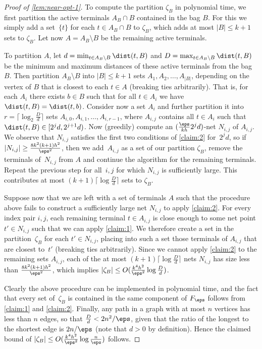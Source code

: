 \begin{proof}[Proof of \autoref{lem:near-opt-1}]
To compute the partition $\zeta_B$ in polynomial time, we first partition the active terminals $A_B\cap B$ contained in the bag $B$. For this we simply add a set~$\{t\}$ for each $t\in A_B\cap B$ to $\zeta_B$, which adds at most $|B|\leq k+1$ sets to $\zeta_B$. Let now $A=A_B\setminus B$ be the remaining active terminals.

To partition $A$, let $d=\min_{t\in A_B\setminus B}\dist(t,B)$ and $D=\max_{t\in 
A_B\setminus B}\dist(t,B)$ be the minimum and maximum distances of these active 
terminals from the bag $B$. Then partition $A_B\setminus B$ into $|B|\le k+1$ 
sets $A_1, A_2,\ldots, A_{|B|}$, depending on the vertex of $B$ that is closest 
to each $t\in A$ (breaking ties arbitrarily). That is, for each $A_i$ there 
exists $b\in B$ such that for all $t\in A_i$ we have $\dist(t,B)=\dist(t,b)$. 
Consider now a set $A_i$ and further partition it into 
$r=\lceil\log_2\frac{D}{d}\rceil$ sets $A_{i,0}, A_{i,1},\ldots, A_{i,r-1}$, 
where $A_{i,j}$ contains all $t\in A_i$ such that $\dist(t,B)\in [2^jd, 
2^{j+1}d)$. Now (greedily) compute an $(\frac{\eps}{kh}2^jd)$-net $N_{i,j}$ of 
$A_{i,j}$. We observe that $N_{i,j}$ satisfies the first two conditions of 
\autoref{claim:2} for~$2^jd$, so if $|N_{i,j}|\ge \frac{8k^2(k+1)h^2}{\eps^2}$, 
then we add~$A_{i,j}$ as a set of our partition $\zeta_B$, remove the terminals 
of~$N_{i,j}$ from $A$ and continue the algorithm for the remaining terminals. 
Repeat the previous step for all~$i,j$ for which $N_{i,j}$ is sufficiently 
large. This contributes at most $(k+1)\lceil\log\frac{D}{d}\rceil$ sets to 
$\zeta_B$.

Suppose now that we are left with a set of terminals $A$ such that the procedure above fails to construct a sufficiently large net $N_{i,j}$ to apply \autoref{claim:2}. For every index pair $i,j$, each remaining terminal $t\in A_{i,j}$ is close enough to some net point $t'\in N_{i,j}$ such that we can apply \autoref{claim:1}. We therefore create a set in the partition~$\zeta_B$ for each $t'\in N_{i,j}$, placing into such a set those terminals of $A_{i,j}$ that are closest to~$t'$ (breaking ties arbitrarily). Since we cannot apply \autoref{claim:2} to the remaining sets $A_{i,j}$, each of the at most $(k+1)\lceil\log\frac{D}{d}\rceil$ nets $N_{i,j}$ has size less than $\frac{8k^2(k+1)h^2}{\eps^2}$, which implies $|\zeta_B|\leq O(\frac{k^4h^2}{\eps^2}\log\frac{D}{d})$.

Clearly the above procedure can be implemented in polynomial time, and the fact that every set of~$\zeta_B$ is contained in the same component of $F_\eps$ follows from \autoref{claim:1} and \autoref{claim:2}. Finally, any path in a graph with at most $n$ vertices has less than $n$ edges, so that $\frac{D}{d}<2n^2/\eps$, given that the ratio of the longest to the shortest edge is $2n/\eps$ (note that $d>0$ by definition). Hence the claimed bound of $|\zeta_B|\leq O(\frac{k^4h^2}{\eps^2}\log\frac{n}{\eps})$ follows.
\end{proof}

